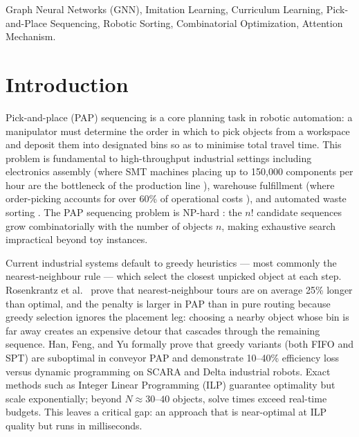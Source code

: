 \documentclass[conference]{IEEEtran}
\begin{document}
\begin{IEEEkeywords}
Graph Neural Networks (GNN), Imitation Learning, Curriculum Learning, Pick-and-Place Sequencing, Robotic Sorting, Combinatorial Optimization, Attention Mechanism.
\end{IEEEkeywords}

\section{Introduction}

Pick-and-place (PAP) sequencing is a core planning task in robotic automation: a manipulator must determine the order in which to pick objects from a workspace and deposit them into designated bins so as to minimise total travel time. This problem is fundamental to high-throughput industrial settings including electronics assembly (where SMT machines placing up to 150,000 components per hour are the bottleneck of the production line \cite{AYOB2008893}), warehouse fulfillment (where order-picking accounts for over 60\% of operational costs \cite{cheng2024drl}), and automated waste sorting \cite{gundupalli2020sequence}. The PAP sequencing problem is NP-hard \cite{chalasani1996}: the $n!$ candidate sequences grow combinatorially with the number of objects $n$, making exhaustive search impractical beyond toy instances.

Current industrial systems default to greedy heuristics --- most commonly the nearest-neighbour rule --- which select the closest unpicked object at each step. Rosenkrantz et al.\ \cite{rosenkrantz1977} prove that nearest-neighbour tours are on average 25\% longer than optimal, and the penalty is larger in PAP than in pure routing because greedy selection ignores the placement leg: choosing a nearby object whose bin is far away creates an expensive detour that cascades through the remaining sequence. Han, Feng, and Yu \cite{han2019pap} formally prove that greedy variants (both FIFO and SPT) are suboptimal in conveyor PAP and demonstrate 10--40\% efficiency loss versus dynamic programming on SCARA and Delta industrial robots. Exact methods such as Integer Linear Programming (ILP) guarantee optimality but scale exponentially; beyond $N \approx 30$--$40$ objects, solve times exceed real-time budgets. This leaves a critical gap: an approach that is near-optimal at ILP quality but runs in milliseconds.
\end{document}
